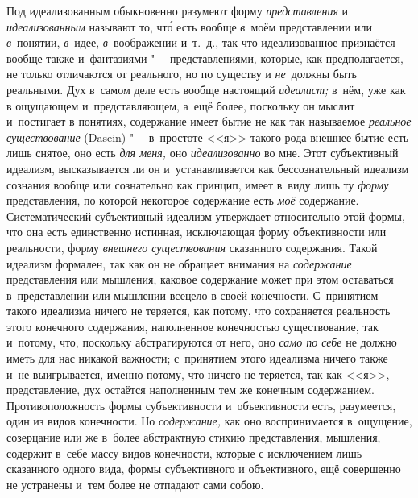 Под идеализованным обыкновенно разумеют форму {\em представления} и
{\em идеализованным} называют то, чт\'{о} есть вообще
{\em в}~моём представлении или {\em в}~понятии, {\em в}~идее,
{\em в}~воображении и~т.~д., так что идеализованное
признаётся вообще также и~фантазиями "--- представлениями, которые, как
предполагается, не только отличаются от реального, но по существу и
{\em не}~должны быть реальными. Дух в~самом деле есть
вообще настоящий {\em идеалист;} в~нём, уже как в
ощущающем и~представляющем, а~ещё более, поскольку он мыслит и~постигает в
понятиях, содержание имеет бытие не как так называемое
{\em реальное существование} (Dasein) "--- в~простоте <<я>>
такого рода внешнее бытие есть лишь снятое, оно есть {\em для меня,} оно
{\em идеализованно} во мне. Этот субъективный идеализм,
высказывается ли он и~устанавливается как бессознательный идеализм сознания
вообще или сознательно как принцип, имеет в~виду лишь ту
{\em форму} представления, по которой некоторое
содержание есть {\em моё} содержание. Систематический
субъективный идеализм утверждает относительно этой формы, что она есть
единственно истинная, исключающая форму объективности или реальности, форму
{\em внешнего существования} сказанного содержания.
Такой идеализм формален, так как он не обращает внимания на
{\em содержание} представления или мышления, каковое
содержание может при этом оставаться в~представлении или мышлении всецело в
своей конечности. С~принятием такого идеализма ничего не теряется, как
потому, что сохраняется реальность этого конечного содержания, наполненное
конечностью существование, так и~потому, что, поскольку абстрагируются от
него, оно {\em само по себе} не должно иметь для нас
никакой важности; с~принятием этого идеализма ничего также и~не
выигрывается, именно потому, что ничего не теряется, так как <<я>>,
представление, дух остаётся наполненным тем же конечным содержанием.
Противоположность формы субъективности и~объективности есть, разумеется,
один из видов конечности. Но {\em содержание,} как оно
воспринимается в~ощущение, созерцание или же в~более абстрактную стихию
представления, мышления, содержит в~себе массу видов конечности, которые с
исключением лишь сказанного одного вида, формы субъективного и
объективного, ещё совершенно не устранены и~тем более не отпадают сами собою.

\bigskip
